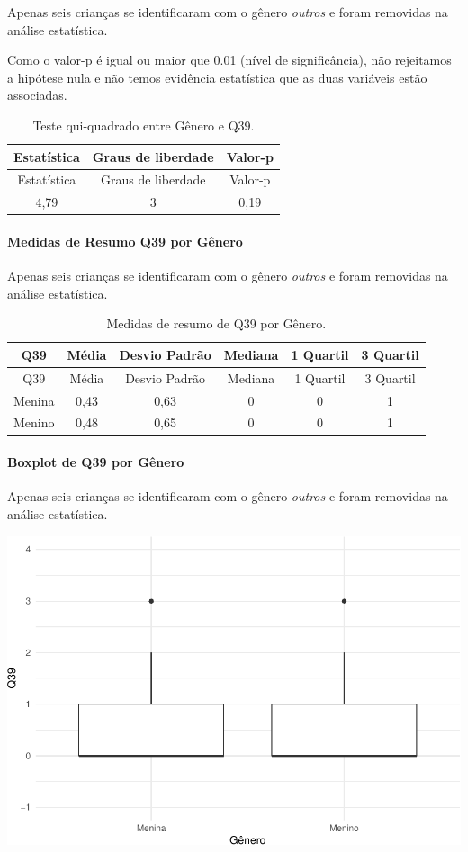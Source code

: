 \documentclass[]{article}
\let\oldparagraph\paragraph
\renewcommand{\paragraph}[1]{\oldparagraph{#1}\mbox{}}
\begin{document}
Apenas seis crianças se identificaram com o gênero \emph{outros} e foram removidas na análise estatística.

Como o valor-p é igual ou maior que 0.01 (nível de significância), não rejeitamos a hipótese nula e não temos evidência estatística que as duas variáveis estão associadas.

\begin{longtable}[]{@{}ccc@{}}
\caption{\label{tab:unnamed-chunk-1501}Teste qui-quadrado entre Gênero e Q39.}\tabularnewline
\toprule
Estatística & Graus de liberdade & Valor-p\tabularnewline
\midrule
\endfirsthead
\toprule
Estatística & Graus de liberdade & Valor-p\tabularnewline
\midrule
\endhead
4,79 & 3 & 0,19\tabularnewline
\bottomrule
\end{longtable}

\cleardoublepage

\hypertarget{medidas-de-resumo-q39-por-guxeanero}{%
\paragraph{Medidas de Resumo Q39 por Gênero}\label{medidas-de-resumo-q39-por-guxeanero}}

Apenas seis crianças se identificaram com o gênero \emph{outros} e foram removidas na análise estatística.

\begin{longtable}[]{@{}cccccc@{}}
\caption{\label{tab:unnamed-chunk-1502}Medidas de resumo de Q39 por Gênero.}\tabularnewline
\toprule
Q39 & Média & Desvio Padrão & Mediana & 1 Quartil & 3 Quartil\tabularnewline
\midrule
\endfirsthead
\toprule
Q39 & Média & Desvio Padrão & Mediana & 1 Quartil & 3 Quartil\tabularnewline
\midrule
\endhead
Menina & 0,43 & 0,63 & 0 & 0 & 1\tabularnewline
Menino & 0,48 & 0,65 & 0 & 0 & 1\tabularnewline
\bottomrule
\end{longtable}

\hypertarget{boxplot-de-q39-por-guxeanero}{%
\paragraph{Boxplot de Q39 por Gênero}\label{boxplot-de-q39-por-guxeanero}}

Apenas seis crianças se identificaram com o gênero \emph{outros} e foram removidas na análise estatística.

\begin{center}\includegraphics[width=0.75\linewidth]{relatorio_covid19_files/figure-latex/unnamed-chunk-1503-1} \end{center}
\end{document}
